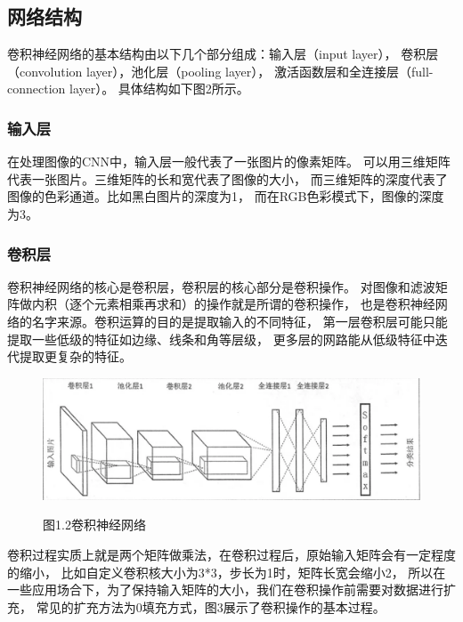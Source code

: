 \documentclass[10.5pt,compsoc,UTF8]{CjC}
\theoremstyle{mystyle}
\begin{document}
\subsection{网络结构}

卷积神经网络的基本结构由以下几个部分组成：输入层（input layer），
卷积层（convolution layer），池化层（pooling layer），
激活函数层和全连接层（full-connection layer）。
具体结构如下图2所示。

\subsubsection{输入层}

在处理图像的CNN中，输入层一般代表了一张图片的像素矩阵。
可以用三维矩阵代表一张图片。三维矩阵的长和宽代表了图像的大小，
而三维矩阵的深度代表了图像的色彩通道。比如黑白图片的深度为1，
而在RGB色彩模式下，图像的深度为3。


\subsubsection{卷积层}

卷积神经网络的核心是卷积层，卷积层的核心部分是卷积操作。
对图像和滤波矩阵做内积（逐个元素相乘再求和）的操作就是所谓的卷积操作，
也是卷积神经网络的名字来源。卷积运算的目的是提取输入的不同特征，
第一层卷积层可能只能提取一些低级的特征如边缘、线条和角等层级，
更多层的网路能从低级特征中迭代提取更复杂的特征。

\begin{figure}[htbp]
\centering
\centerline{\includegraphics[width=1\linewidth]{CNN2.png}}

\heiti 图1.2\quad  卷积神经网络
\label{fig1}
\end{figure}

卷积过程实质上就是两个矩阵做乘法，在卷积过程后，原始输入矩阵会有一定程度的缩小，
比如自定义卷积核大小为3*3，步长为1时，矩阵长宽会缩小2，
所以在一些应用场合下，为了保持输入矩阵的大小，我们在卷积操作前需要对数据进行扩充，
常见的扩充方法为0填充方式，图3展示了卷积操作的基本过程。
\end{document}
